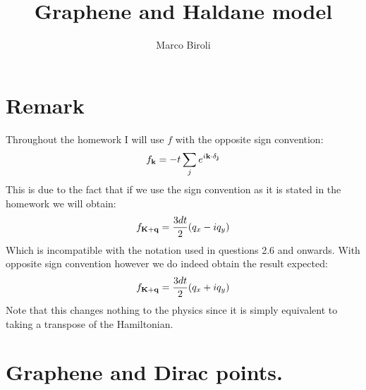 \documentclass[10pt,a4paper]{article}
\author{Marco Biroli}
\title{Graphene and Haldane model}
\begin{document}
\maketitle

\section{Remark}

Throughout the homework I will use $f$ with the opposite sign convention:
\[
f_{\vb{k}} = -t \sum_j e^{i\vb{k} \cdot \vb{\delta_j}}
\]
This is due to the fact that if we use the sign convention as it is stated in the homework we will obtain:
\[
f_{\vb{K} + \vb{q}} = \frac{3 d t}{2}(q_x - iq_y)
\]
Which is incompatible with the notation used in questions 2.6 and onwards. With opposite sign convention however we do indeed obtain the result expected:
\[
f_{\vb{K} + \vb{q}} = \frac{3 d t}{2}(q_x + iq_y)
\]
Note that this changes nothing to the physics since it is simply equivalent to taking a transpose of the Hamiltonian. 

\section{Graphene and Dirac points.}
\end{document}
